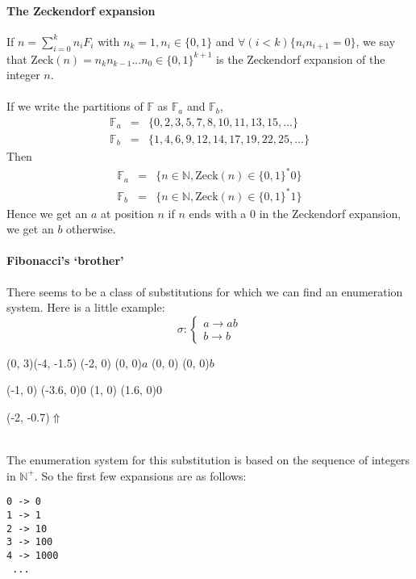 \documentclass{article}
\begin{document}
\paragraph{The Zeckendorf expansion}
If $n = \sum_{i = 0}^k n_i F_i$ with $n_k = 1, n_i \in \{0, 1\}$ and
$\forall (i < k) \{n_i n_{i + 1} = 0\}$, we say that
Zeck$(n) = n_k n_{k - 1} ... n_0 \in \{0, 1\}^{k + 1}$ is the Zeckendorf
expansion of the integer $n$.\\
\\
If we write the partitions of
$\mathbb{F}$ as $\mathbb{F}_a$ and $\mathbb{F}_b$,
\begin{eqnarray*}
  \mathbb{F}_a &=& \{0, 2, 3, 5, 7, 8, 10, 11, 13, 15, ...\}\\
  \mathbb{F}_b &=& \{1, 4, 6, 9, 12, 14, 17, 19, 22, 25, ...\}
\end{eqnarray*}
Then
\begin{eqnarray*}
  \mathbb{F}_a &=& \{n \in \mathbb{N}, \mathrm{Zeck}(n) \in \{0, 1\}^* 0\}\\
  \mathbb{F}_b &=& \{n \in \mathbb{N}, \mathrm{Zeck}(n) \in \{0, 1\}^* 1\}
\end{eqnarray*}
Hence we get an $a$ at position $n$ if $n$ ends with a 0 in the
Zeckendorf expansion, we get an $b$ otherwise.

\paragraph{Fibonacci's `brother'}
There seems to be a class of substitutions for which we can find an enumeration
system. Here is a little example:
\begin{displaymath}
\sigma: \left\{ \begin{array}{l}
a \rightarrow ab\\
b \rightarrow b
\end{array} \right.
\end{displaymath}
\begin{graph}(0, 3)(-4, -1.5)
  (-2, 0) (0, 0){$a$}
  (0, 0)  (0, 0){$b$}

  (-1, 0) \freetext(-3.6, 0){0}
   
  (1, 0) \freetext(1.6, 0){0}

  \freetext(-2, -0.7){$\Uparrow$}
\end{graph}\\
The enumeration system for this substitution is based on the sequence of 
integers in $\mathbb{N}^+$. So the first few expansions are as follows:
\begin{verbatim}
0 -> 0
1 -> 1
2 -> 10
3 -> 100
4 -> 1000
 ...
\end{verbatim}
\end{document}
